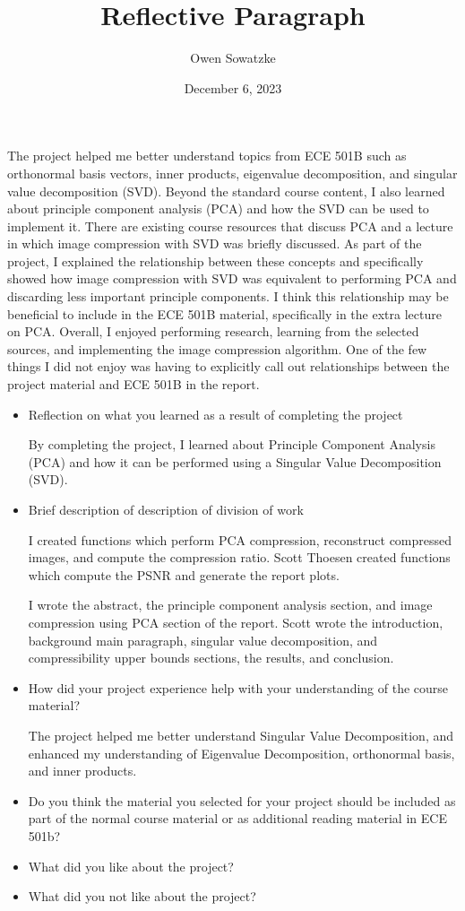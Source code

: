 \documentclass{article}
\title{Reflective Paragraph}
\author{Owen Sowatzke}
\date{December 6, 2023}
\begin{document}
	\maketitle

	The project helped me better understand topics from ECE 501B such as orthonormal basis vectors, inner products, eigenvalue decomposition, and singular value decomposition (SVD). Beyond the standard course content, I also learned about principle component analysis (PCA) and how the SVD can be used to implement it. There are existing course resources that discuss PCA and a lecture in which image compression with SVD was briefly discussed. As part of the project, I explained the relationship between these concepts and specifically showed how image compression with SVD was equivalent to performing PCA and discarding less important principle components. I think this relationship may be beneficial to include in the ECE 501B material, specifically in the extra lecture on PCA. Overall, I enjoyed performing research, learning from the selected sources, and implementing the image compression algorithm. One of the few things I did not enjoy was having to explicitly call out relationships between the project material and ECE 501B in the report.
	\begin{itemize}
	
		\item Reflection on what you learned as a result of completing the project
	
		By completing the project, I learned about Principle Component Analysis (PCA) and how it can be performed using a Singular Value Decomposition (SVD).
		 
		\item Brief description of description of division of work
		
		I created functions which perform PCA compression, reconstruct compressed images, and compute the compression ratio. Scott Thoesen created functions which compute the PSNR and generate the report plots.
		
		I wrote the abstract, the principle component analysis section, and image compression using PCA section of the report. Scott wrote the introduction, background main paragraph, singular value decomposition, and compressibility upper bounds sections, the results, and conclusion.
	
		\item How did your project experience help with your understanding of the course material?
	
		The project helped me better understand Singular Value Decomposition, and enhanced my understanding of Eigenvalue Decomposition, orthonormal basis, and inner products. 
		
		\item Do you think the material you selected for your project should be included as part of the normal course material or as additional reading material in ECE 501b?
	
		\item What did you like about the project?
	
		\item What did you not like about the project?
		 
	\end{itemize}
\end{document}
